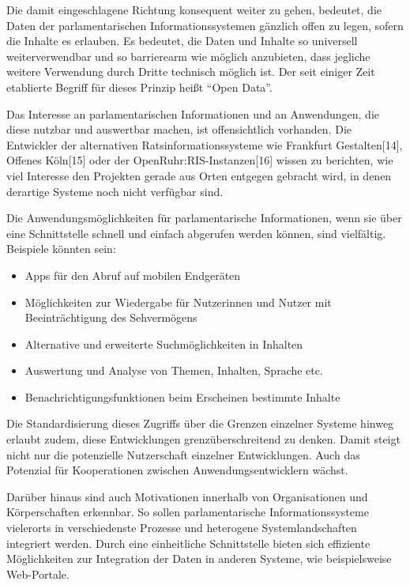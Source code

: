 \documentclass[,a4paper]{article}
\begin{document}
Die damit eingeschlagene Richtung konsequent weiter zu gehen, bedeutet,
die Daten der parlamentarischen Informationssystemen gänzlich offen zu
legen, sofern die Inhalte es erlauben. Es bedeutet, die Daten und
Inhalte so universell weiterverwendbar und so barrierearm wie möglich
anzubieten, dass jegliche weitere Verwendung durch Dritte technisch
möglich ist. Der seit einiger Zeit etablierte Begriff für dieses Prinzip
heißt ``Open Data''.

Das Interesse an parlamentarischen Informationen und an Anwendungen, die
diese nutzbar und auswertbar machen, ist offensichtlich vorhanden. Die
Entwickler der alternativen Ratsinformationssysteme wie Frankfurt
Gestalten{[}14{]}, Offenes Köln{[}15{]} oder der
OpenRuhr:RIS-Instanzen{[}16{]} wissen zu berichten, wie viel Interesse
den Projekten gerade aus Orten entgegen gebracht wird, in denen
derartige Systeme noch nicht verfügbar sind.

Die Anwendungsmöglichkeiten für parlamentarische Informationen, wenn sie
über eine Schnittstelle schnell und einfach abgerufen werden können,
sind vielfältig. Beispiele könnten sein:

\begin{itemize}
\item
  Apps für den Abruf auf mobilen Endgeräten
\item
  Möglichkeiten zur Wiedergabe für Nutzerinnen und Nutzer mit
  Beeinträchtigung des Sehvermögens
\item
  Alternative und erweiterte Suchmöglichkeiten in Inhalten
\item
  Auswertung und Analyse von Themen, Inhalten, Sprache etc.
\item
  Benachrichtigungsfunktionen beim Erscheinen bestimmte Inhalte
\end{itemize}

Die Standardisierung dieses Zugriffs über die Grenzen einzelner Systeme
hinweg erlaubt zudem, diese Entwicklungen grenzüberschreitend zu denken.
Damit steigt nicht nur die potenzielle Nutzerschaft einzelner
Entwicklungen. Auch das Potenzial für Kooperationen zwischen
Anwendungsentwicklern wächst.

Darüber hinaus sind auch Motivationen innerhalb von Organisationen und
Körperschaften erkennbar. So sollen parlamentarische Informationssysteme
vielerorts in verschiedenste Prozesse und heterogene Systemlandschaften
integriert werden. Durch eine einheitliche Schnittstelle bieten sich
effiziente Möglichkeiten zur Integration der Daten in anderen Systeme,
wie beispielsweise Web-Portale.
\end{document}

